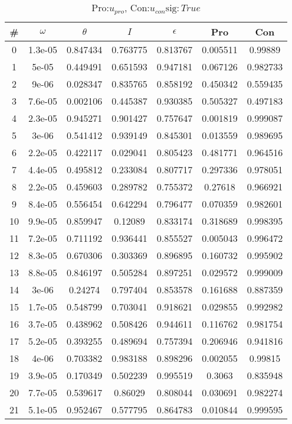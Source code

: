 \begin{table}
\caption{Pro:$u_{pro}$, Con:$u_{con}$$\mathrm{sig}:True$}
\begin{tabular}{c|c|c|c|c|c|c}
\# & $\omega$ & $\theta$ & $I$ & $\epsilon$ & Pro & Con\\
\hline
0 & 1.3e-05 & 0.847434 & 0.763775 & 0.813767 & 0.005511 & 0.99889\\
1 & 5e-05 & 0.449491 & 0.651593 & 0.947181 & 0.067126 & 0.982733\\
2 & 9e-06 & 0.028347 & 0.835765 & 0.858192 & 0.450342 & 0.559435\\
3 & 7.6e-05 & 0.002106 & 0.445387 & 0.930385 & 0.505327 & 0.497183\\
4 & 2.3e-05 & 0.945271 & 0.901427 & 0.757647 & 0.001819 & 0.999087\\
5 & 3e-06 & 0.541412 & 0.939149 & 0.845301 & 0.013559 & 0.989695\\
6 & 2.2e-05 & 0.422117 & 0.029041 & 0.805423 & 0.481771 & 0.964516\\
7 & 4.4e-05 & 0.495812 & 0.233084 & 0.807717 & 0.297336 & 0.978051\\
8 & 2.2e-05 & 0.459603 & 0.289782 & 0.755372 & 0.27618 & 0.966921\\
9 & 8.4e-05 & 0.556454 & 0.642294 & 0.796477 & 0.070359 & 0.982601\\
10 & 9.9e-05 & 0.859947 & 0.12089 & 0.833174 & 0.318689 & 0.998395\\
11 & 7.2e-05 & 0.711192 & 0.936441 & 0.855527 & 0.005043 & 0.996472\\
12 & 8.3e-05 & 0.670306 & 0.303369 & 0.896895 & 0.160732 & 0.995902\\
13 & 8.8e-05 & 0.846197 & 0.505284 & 0.897251 & 0.029572 & 0.999009\\
14 & 3e-06 & 0.24274 & 0.797404 & 0.853578 & 0.161688 & 0.887359\\
15 & 1.7e-05 & 0.548799 & 0.703041 & 0.918621 & 0.029855 & 0.992982\\
16 & 3.7e-05 & 0.438962 & 0.508426 & 0.944611 & 0.116762 & 0.981754\\
17 & 5.2e-05 & 0.393255 & 0.489694 & 0.757394 & 0.206946 & 0.941816\\
18 & 4e-06 & 0.703382 & 0.983188 & 0.898296 & 0.002055 & 0.99815\\
19 & 3.9e-05 & 0.170349 & 0.502239 & 0.995519 & 0.3063 & 0.835948\\
20 & 7.7e-05 & 0.539617 & 0.86029 & 0.808044 & 0.030691 & 0.982274\\
21 & 5.1e-05 & 0.952467 & 0.577795 & 0.864783 & 0.010844 & 0.999595\\

\end{tabular}
\end{table}
